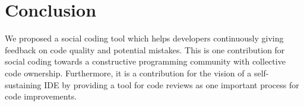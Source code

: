 
\section{Conclusion}
We proposed a social coding tool which helps developers continuously giving feedback on code quality and potential mistakes.
%
This is one contribution for social coding towards a constructive programming community with collective code ownership. 
%
Furthermore, it is a contribution for the vision of a self-sustaining IDE by providing a tool for code reviews as one important process for code improvements. 